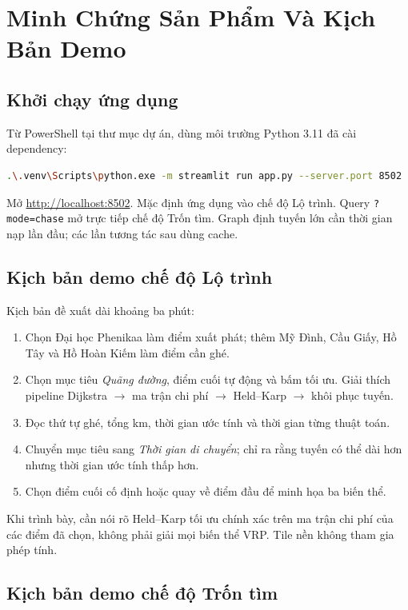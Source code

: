 \chapter{Minh Chứng Sản Phẩm Và Kịch Bản Demo}

\section{Khởi chạy ứng dụng}

Từ PowerShell tại thư mục dự án, dùng môi trường Python 3.11 đã cài dependency:

\begin{lstlisting}[language=bash,caption={Lệnh khởi chạy ứng dụng}]
.\.venv\Scripts\python.exe -m streamlit run app.py --server.port 8502
\end{lstlisting}

Mở \url{http://localhost:8502}. Mặc định ứng dụng vào chế độ Lộ trình. Query
\texttt{?mode=chase} mở trực tiếp chế độ Trốn tìm. Graph định tuyến lớn cần thời
gian nạp lần đầu; các lần tương tác sau dùng cache.

\section{Kịch bản demo chế độ Lộ trình}

Kịch bản đề xuất dài khoảng ba phút:
\begin{enumerate}
  \item Chọn Đại học Phenikaa làm điểm xuất phát; thêm Mỹ Đình, Cầu Giấy, Hồ Tây
  và Hồ Hoàn Kiếm làm điểm cần ghé.
  \item Chọn mục tiêu \textit{Quãng đường}, điểm cuối tự động và bấm tối ưu.
  Giải thích pipeline Dijkstra $\rightarrow$ ma trận chi phí $\rightarrow$
  Held--Karp $\rightarrow$ khôi phục tuyến.
  \item Đọc thứ tự ghé, tổng km, thời gian ước tính và thời gian từng thuật toán.
  \item Chuyển mục tiêu sang \textit{Thời gian di chuyển}; chỉ ra rằng tuyến có
  thể dài hơn nhưng thời gian ước tính thấp hơn.
  \item Chọn điểm cuối cố định hoặc quay về điểm đầu để minh họa ba biến thể.
\end{enumerate}

Khi trình bày, cần nói rõ Held--Karp tối ưu chính xác trên ma trận chi phí của các
điểm đã chọn, không phải giải mọi biến thể VRP. Tile nền không tham gia phép tính.

\section{Kịch bản demo chế độ Trốn tìm}

